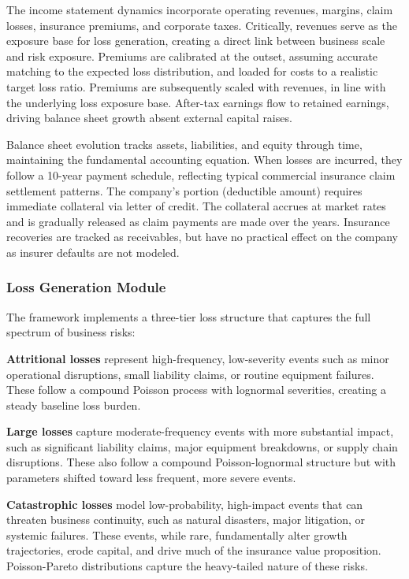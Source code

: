 \documentclass[11pt,letterpaper]{article}
\begin{document}
The income statement dynamics incorporate operating revenues, margins, claim losses, insurance premiums, and corporate taxes. Critically, revenues serve as the exposure base for loss generation, creating a direct link between business scale and risk exposure. Premiums are calibrated at the outset, assuming accurate matching to the expected loss distribution, and loaded for costs to a realistic target loss ratio. Premiums are subsequently scaled with revenues, in line with the underlying loss exposure base. After-tax earnings flow to retained earnings, driving balance sheet growth absent external capital raises.

Balance sheet evolution tracks assets, liabilities, and equity through time, maintaining the fundamental accounting equation. When losses are incurred, they follow a 10-year payment schedule, reflecting typical commercial insurance claim settlement patterns. The company's portion (deductible amount) requires immediate collateral via letter of credit. The collateral accrues at market rates and is gradually released as claim payments are made over the years. Insurance recoveries are tracked as receivables, but have no practical effect on the company as insurer defaults are not modeled.

\subsubsection{Loss Generation Module}

The framework implements a three-tier loss structure that captures the full spectrum of business risks:

\textbf{Attritional losses} represent high-frequency, low-severity events such as minor operational disruptions, small liability claims, or routine equipment failures. These follow a compound Poisson process with lognormal severities, creating a steady baseline loss burden.

\textbf{Large losses} capture moderate-frequency events with more substantial impact, such as significant liability claims, major equipment breakdowns, or supply chain disruptions. These also follow a compound Poisson-lognormal structure but with parameters shifted toward less frequent, more severe events.

\textbf{Catastrophic losses} model low-probability, high-impact events that can threaten business continuity, such as natural disasters, major litigation, or systemic failures. These events, while rare, fundamentally alter growth trajectories, erode capital, and drive much of the insurance value proposition. Poisson-Pareto distributions capture the heavy-tailed nature of these risks.
\end{document}
